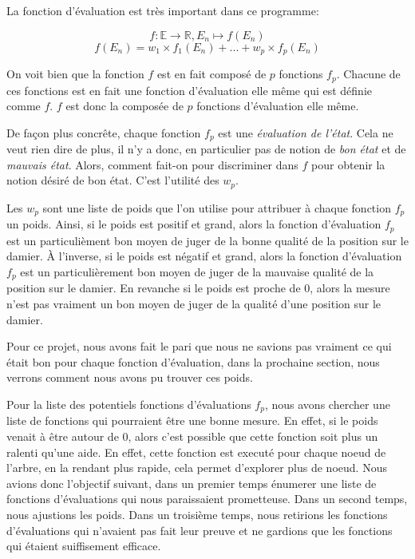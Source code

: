 \documentclass[a4paper,11pt]{article}
\begin{document}
\begin{multicols}{2}[]
    La fonction d'évaluation est très important dans ce programme:
    
    \[ f : \mathbb{E} \to \mathbb{R},
      E_{n} \mapsto f(E_{n}) \]
    \[ f(E_{n}) = w_{1} \times f_{1}(E_{n}) + ... + w_{p} \times f_{p}(E_{n}) \]

    On voit bien que la fonction $f$ est en fait composé de $p$ fonctions
    $f_{p}$. Chacune de ces fonctions est en fait une fonction d'évaluation elle
    même qui est définie comme $f$. $f$ est donc la composée de $p$ fonctions
    d'évaluation elle même.

    De façon plus concrête, chaque fonction $f_{p}$ est une \emph{évaluation de
    l'état}. Cela ne veut rien dire de plus, il n'y a donc, en particulier pas
    de notion de \emph{bon état} et de \emph{mauvais état}. Alors, comment
    fait-on pour discriminer dans $f$ pour obtenir la notion désiré de bon état.
    C'est l'utilité des $w_{p}$.

    Les $w_{p}$ sont une liste de poids que l'on utilise pour attribuer à chaque
    fonction $f_{p}$ un poids. Ainsi, si le poids est positif et grand, alors la
    fonction d'évaluation $f_{p}$ est un particulièment bon moyen de juger de la
    bonne qualité de la position sur le damier. À l'inverse, si le poids est
    négatif et grand, alors la fonction d'évaluation $f_{p}$ est un
    particulièrement bon moyen de juger de la mauvaise qualité de la position
    sur le damier. En revanche si le poids est proche de $0$, alors la mesure
    n'est pas vraiment un bon moyen de juger de la qualité d'une position sur le
    damier.

    Pour ce projet, nous avons fait le pari que nous ne savions pas vraiment ce
    qui était bon pour chaque fonction d'évaluation, dans la prochaine section,
    nous verrons comment nous avons pu trouver ces poids.

    Pour la liste des potentiels fonctions d'évaluations $f_{p}$, nous avons
    chercher une liste de fonctions qui pourraient être une bonne mesure. En
    effet, si le poids venait à être autour de 0, alors c'est possible que cette
    fonction soit plus un ralenti qu'une aide. En effet, cette fonction est
    executé pour chaque noeud de l'arbre, en la rendant plus rapide, cela permet
    d'explorer plus de noeud. Nous avions donc l'objectif suivant, dans un
    premier temps énumerer une liste de fonctions d'évaluations qui nous
    paraissaient prometteuse. Dans un second temps, nous ajustions les poids.
    Dans un troisième temps, nous retirions les fonctions d'évaluations qui
    n'avaient pas fait leur preuve et ne gardions que les fonctions qui étaient
    suiffisement efficace.


\end{multicols}
\end{document}
